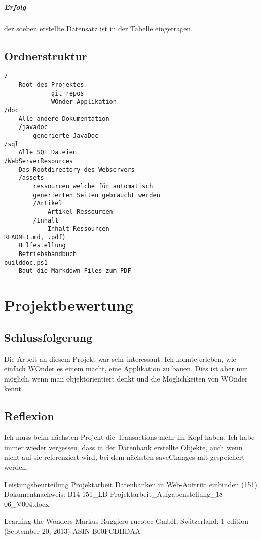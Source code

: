 \documentclass[a4paper, 11pt]{article}
\begin{document}
\subparagraph{Erfolg}

der soeben erstellte Datensatz ist in der Tabelle eingetragen.


\clearpage
\subsection{Ordnerstruktur}

\begin{verbatim}
/
    Root des Projektes
             git repos
             WOnder Applikation
/doc
    Alle andere Dokumentation
    /javadoc
        generierte JavaDoc
/sql
    Alle SQL Dateien
/WebServerResources
    Das Rootdirectory des Webservers
    /assets
        ressourcen welche für automatisch
        generierten Seiten gebraucht werden
        /Artikel
            Artikel Ressourcen
        /Inhalt
            Inhalt Ressourcen
README(.md, .pdf)
	Hilfestellung
	Betriebshandbuch
builddoc.ps1
	Baut die Markdown Files zum PDF
\end{verbatim}

\section{Projektbewertung}

\subsection{Schlussfolgerung}

Die Arbeit an diesem Projekt war sehr interessant. Ich konnte erleben, wie einfach WOnder es einem macht, eine Applikation zu bauen. Dies ist aber nur möglich, wenn man objektorientiert denkt und die Möglichkeiten von WOnder kennt.

\subsection{Reflexion}

Ich muss beim nächsten Projekt die Transactions mehr im Kopf haben. Ich habe immer wieder vergessen, dass in der Datenbank erstellte Objekte, auch wenn nicht auf sie referenziert wird, bei dem nächsten saveChanges mit gespeichert werden.

\begin{thebibliography}{9}
Leistungsbeurteilung Projektarbeit
Datenbanken in Web-Auftritt einbinden (151)
Dokumentnachweis: B14-151\_LB-Projektarbeit\_Aufgabenstellung\_18-06\_V004.docx

Learning the Wonders
Markus Ruggiero
rucotec GmbH, Switzerland; 1 edition (September 20, 2013)
ASIN B00FCDHDAA

\end{thebibliography}
\end{document}

